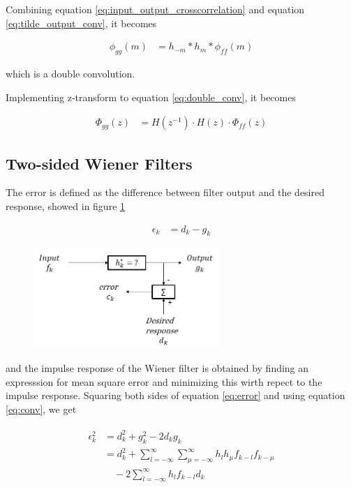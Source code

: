 \documentclass[8pt,a4paper]{article}
\begin{document}
\begin{multicols}{2}
Combining equation \ref{eq:input_output_crosscorrelation} and equation \ref{eq:tilde_output_conv}, it becomes 

\begin{align}
  \label{eq:double_conv}
  \phi_{gg}(m) &= h_{-m} * h_{m} * \phi_{ff}(m)
\end{align}

which is a double convolution.

Implementing z-transform to equation \ref{eq:double_conv}, it becomes

\begin{align}
  \Phi_{gg}(z) &= H(z^{-1}) \cdot H(z) \cdot \Phi_{ff}(z)
\end{align}


\subsection*{Two-sided Wiener Filters}

The error is defined as the difference between filter output and the desired response, showed in figure \ref{fig:wiener}

\begin{align}
  \label{eq:error}
  \epsilon_{k} &= d_{k} - g_{k}
\end{align}


\begin{figure}[H]
  \begin{center}
      \includegraphics[width=200pt]{./Figures/wiener.jpg}
      \caption{}
      \label{fig:wiener}
  \end{center}
\end{figure}


and the impulse response of the Wiener filter is obtained by finding an expresssion for mean square error and minimizing this wirth repect to the impulse response. 
Squaring both sides of equation \ref{eq:error} and using equation \ref{eq:conv}, we get

\begin{align}
  \begin{split}
    \epsilon_{k}^{2}&= d_{k}^{2} + g_{k}^{2} -2d_{k}g_{k} \\
    &= d_{k}^{2} + \sum_{l=-\infty}^{\infty} \sum_{\mu=-\infty}^{\infty} h_{l}h_{\mu}f_{k-l}f_{k-\mu} \\ 
    &\quad -2 \sum_{l=-\infty}^{\infty} h_{l}f_{k-l}d_{k}
  \end{split}
\end{align}


\end{multicols}
\end{document}
